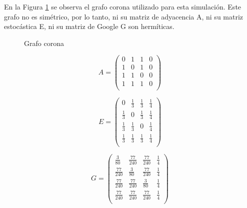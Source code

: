 En la Figura \ref{fig:crown} se observa el grafo corona utilizado para esta simulación. Este grafo no es simétrico, por lo tanto, ni su matriz de adyacencia A, ni su matriz estocástica E, ni su matriz de Google G son hermíticas.

\begin{figure}[H]
    \centering
    \caption[Grafo corona]{Grafo corona}
    \label{fig:crown}
\end{figure}

\begin{equation}
    A =
    \begin{pmatrix}
        0 & 1 & 1 & 0 \\
        1 & 0 & 1 & 0 \\
        1 & 1 & 0 & 0 \\
        1 & 1 & 1 & 0 \\
    \end{pmatrix}
\end{equation}

\begin{equation}
    E =
    \begin{pmatrix}
        0 & \frac{1}{3} & \frac{1}{3} & \frac{1}{4} \\
        \frac{1}{3} & 0 & \frac{1}{3} & \frac{1}{4} \\
        \frac{1}{3} & \frac{1}{3} & 0 & \frac{1}{4} \\
        \frac{1}{3} & \frac{1}{3} & \frac{1}{3} & \frac{1}{4} \\
    \end{pmatrix}
\end{equation}

\begin{equation}
    G =
    \begin{pmatrix}
        \frac{3}{80} & \frac{77}{240} & \frac{77}{240} & \frac{1}{4} \\
        \frac{77}{240} & \frac{3}{80} & \frac{77}{240} & \frac{1}{4} \\
        \frac{77}{240} & \frac{77}{240} & \frac{3}{80} & \frac{1}{4} \\
        \frac{77}{240} & \frac{77}{240} & \frac{77}{240} & \frac{1}{4} \\
    \end{pmatrix}
\end{equation}

